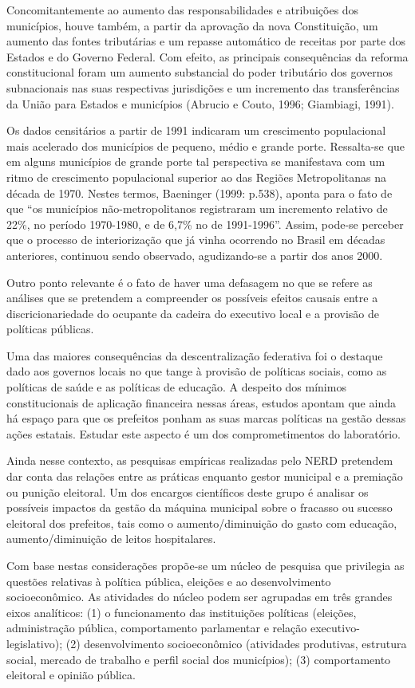 \documentclass[
  12pt,
]{report}
\begin{document}
Concomitantemente ao aumento das responsabilidades e atribuições dos
municípios, houve também, a partir da aprovação da nova Constituição, um
aumento das fontes tributárias e um repasse automático de receitas por
parte dos Estados e do Governo Federal. Com efeito, as principais
consequências da reforma constitucional foram um aumento substancial do
poder tributário dos governos subnacionais nas suas respectivas
jurisdições e um incremento das transferências da União para Estados e
municípios (Abrucio e Couto, 1996; Giambiagi, 1991).

Os dados censitários a partir de 1991 indicaram um crescimento
populacional mais acelerado dos municípios de pequeno, médio e grande
porte. Ressalta-se que em alguns municípios de grande porte tal
perspectiva se manifestava com um ritmo de crescimento populacional
superior ao das Regiões Metropolitanas na década de 1970. Nestes termos,
Baeninger (1999: p.538), aponta para o fato de que ``os municípios
não-metropolitanos registraram um incremento relativo de 22\%, no
período 1970-1980, e de 6,7\% no de 1991-1996''. Assim, pode-se perceber
que o processo de interiorização que já vinha ocorrendo no Brasil em
décadas anteriores, continuou sendo observado, agudizando-se a partir
dos anos 2000.

Outro ponto relevante é o fato de haver uma defasagem no que se refere
as análises que se pretendem a compreender os possíveis efeitos causais
entre a discricionariedade do ocupante da cadeira do executivo local e a
provisão de políticas públicas.

Uma das maiores consequências da descentralização federativa foi o
destaque dado aos governos locais no que tange à provisão de políticas
sociais, como as políticas de saúde e as políticas de educação. A
despeito dos mínimos constitucionais de aplicação financeira nessas
áreas, estudos apontam que ainda há espaço para que os prefeitos ponham
as suas marcas políticas na gestão dessas ações estatais. Estudar este
aspecto é um dos comprometimentos do laboratório.

Ainda nesse contexto, as pesquisas empíricas realizadas pelo NERD
pretendem dar conta das relações entre as práticas enquanto gestor
municipal e a premiação ou punição eleitoral. Um dos encargos
científicos deste grupo é analisar os possíveis impactos da gestão da
máquina municipal sobre o fracasso ou sucesso eleitoral dos prefeitos,
tais como o aumento/diminuição do gasto com educação, aumento/diminuição
de leitos hospitalares.

Com base nestas considerações propõe-se um núcleo de pesquisa que
privilegia as questões relativas à política pública, eleições e ao
desenvolvimento socioeconômico. As atividades do núcleo podem ser
agrupadas em três grandes eixos analíticos: (1) o funcionamento das
instituições políticas (eleições, administração pública, comportamento
parlamentar e relação executivo-legislativo); (2) desenvolvimento
socioeconômico (atividades produtivas, estrutura social, mercado de
trabalho e perfil social dos municípios); (3) comportamento eleitoral e
opinião pública.
\end{document}
